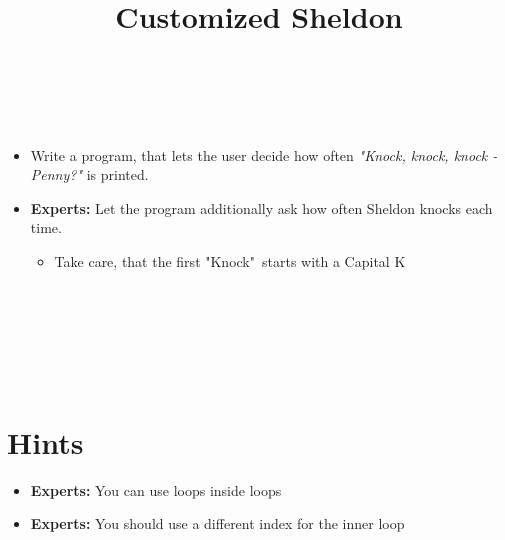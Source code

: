 


\title{Customized Sheldon} %
\author{} %
\renewcommand{\difficulty}{Easy} %
\renewcommand{\requirements}{Variables, input/output, loops} %
\renewcommand{\aims}{Looping around} %


 \maketitle
 \taskinfos

\ \\\ \\
\begin{itemize}
	\item Write a program, that lets the user decide how often \textit{"Knock, knock, knock - Penny?"} is printed.
	\item \textbf{Experts:} Let the program additionally ask how often Sheldon knocks each time.
	\begin{itemize}
		\item Take care, that the first "Knock"\ starts with a Capital K
	\end{itemize}
\end{itemize}	
 
 
\ \\\ \\\ \\\ \\\ \\
\section*{Hints}
	\begin{itemize}
		\item \textbf{Experts:} You can use loops inside loops
		\item \textbf{Experts:} You should use a different index for the inner loop
	\end{itemize}
 

